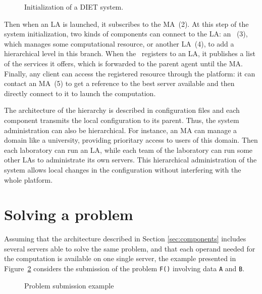 \begin{figure}[hbt]
  \begin{center}
    \caption{Initialization of a DIET system.}
    \label{fig:init}
  \end{center}
\end{figure}

Then when an LA is launched, it subscribes to the MA~(2). At this step of the
system initialization, two kinds of components can connect to the LA: an
\sed ~(3), which manages some computational resource, or another LA~(4), to add a
hierarchical level in this branch. When the \sed\ registers to an LA, it
publishes a list of the services it offers, which is forwarded to the parent
agent until the MA.
Finally, any client can access the registered resource through the platform: it
can contact an MA~(5) to get a reference to the best server available and then
directly connect to it to launch the computation.

The architecture of the hierarchy is described in configuration files and each
component transmits the local configuration to its parent. Thus, the system
administration can also be hierarchical. For instance, an MA can manage a domain
like a university, providing prioritary access to users of this domain. Then
each laboratory can run an LA, while each team of the laboratory can run some
other LAs to administrate its own servers. This hierarchical administration of
the system allows local changes in the configuration without interfering with
the whole platform.



\section{Solving a problem}
\label{sec:solvepb}

Assuming that the architecture described in Section \ref{sec:components}
includes several servers able to solve the same problem, and that each operand
needed for the computation is available on one single server, the example
presented in Figure~\ref{fig:submit_pb} considers the submission of the problem
\texttt{F()} involving data \texttt{A} and \texttt{B}.


\begin{figure}[hbt]
  \begin{center}
    \caption{Problem submission example}
    \label{fig:submit_pb}
  \end{center}
\end{figure}


